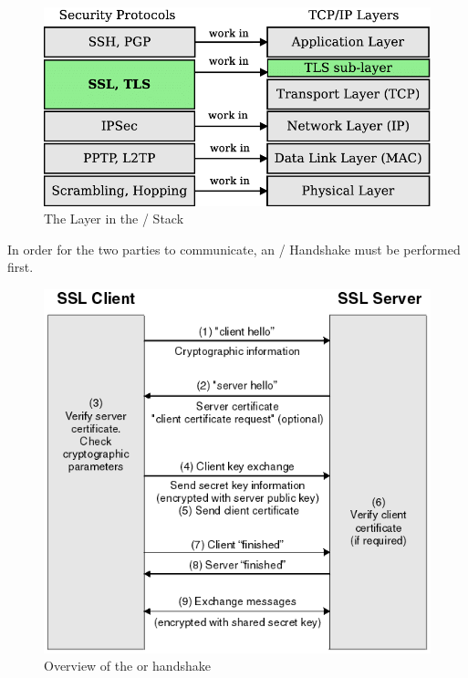 \begin{figure}[!hb]
    \centering
    \includegraphics[width=13cm]{img/ssl-stack.png}
    \caption{The  Layer in the / Stack}
    \label{SSL Layer}
\end{figure}


\newpage

In order for the two parties to communicate, an / Handshake must be performed first.


\begin{figure}[!hb]
 \centering
 \includegraphics[width=13cm]{img/ssl_handshake.png}
 \caption{Overview of the  or  handshake\cite{ibm-handshake}}
 \label{SSL handshake}
\end{figure}


